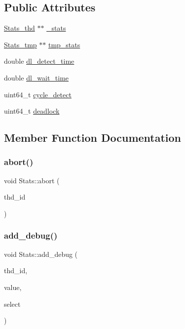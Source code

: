 \subsection*{Public Attributes}
\begin{DoxyCompactItemize}
\item 
\hyperlink{classStats__thd}{Stats\+\_\+thd} $\ast$$\ast$ \hyperlink{classStats_a0cebcc9e1772f74a3f93b8df9f07d05b}{\+\_\+stats}
\item 
\hyperlink{classStats__tmp}{Stats\+\_\+tmp} $\ast$$\ast$ \hyperlink{classStats_aa34f9c95002659dc382038861b3714db}{tmp\+\_\+stats}
\item 
double \hyperlink{classStats_a1fc8cf0036deec35ea41b1c8e5c2a4f5}{dl\+\_\+detect\+\_\+time}
\item 
double \hyperlink{classStats_a652b993afd04f06abc32425aa02f6e71}{dl\+\_\+wait\+\_\+time}
\item 
uint64\+\_\+t \hyperlink{classStats_a689ffff3edb9e712402d4a77884a0bde}{cycle\+\_\+detect}
\item 
uint64\+\_\+t \hyperlink{classStats_ac2fb99c156801571a88e02b50a10edf0}{deadlock}
\end{DoxyCompactItemize}


\subsection{Member Function Documentation}
\mbox{\label{classStats_a39df95409064be60b817937478582ad8}} 
\subsubsection{\texorpdfstring{abort()}{abort()}}
{\footnotesize\ttfamily void Stats\+::abort (\begin{DoxyParamCaption}\item[{uint64\+\_\+t}]{thd\+\_\+id }\end{DoxyParamCaption})}

\mbox{\label{classStats_aff90f0400fbb556c037f139dcb596608}} 
\subsubsection{\texorpdfstring{add\+\_\+debug()}{add\_debug()}}
{\footnotesize\ttfamily void Stats\+::add\+\_\+debug (\begin{DoxyParamCaption}\item[{uint64\+\_\+t}]{thd\+\_\+id,  }\item[{uint64\+\_\+t}]{value,  }\item[{uint32\+\_\+t}]{select }\end{DoxyParamCaption})}

